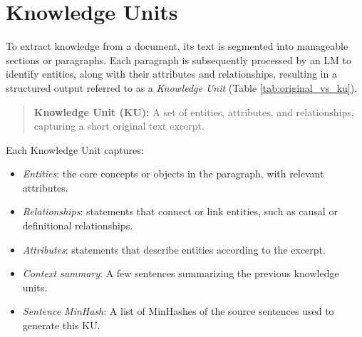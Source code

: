 \vspace{-0.2cm}
\section{Knowledge Units}

To extract knowledge from a document, its text is segmented into manageable sections or paragraphs. Each paragraph is subsequently processed by an LM to identify entities, along with their attributes and relationships, resulting in a structured output referred to as a \textit{Knowledge Unit} (Table \ref{tab:original_vs_ku}).

\vspace{-1.0em}

\begin{quote}
\textbf{Knowledge Unit (KU):} A set of entities, attributes, and relationships, capturing a short original text excerpt. 
\end{quote}

\vspace{-1.0em}
Each Knowledge Unit captures:
\begin{itemize}[leftmargin=*,noitemsep,topsep=0em]
    \item \textit{Entities}: the core concepts or objects in the paragraph, with relevant attributes.
    \item \textit{Relationships}: statements that connect or link entities, such as causal or definitional relationships.
    \item \textit{Attributes}: statements that describe entities according to the excerpt.
    \item \textit{Context summary}: A few sentences summarizing the previous knowledge units.
    \item \textit{Sentence MinHash}: A list of MinHashes of the source sentences used to generate this KU. 
\end{itemize}


